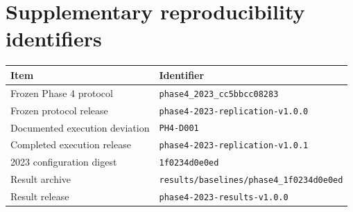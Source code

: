 \documentclass[11pt]{article}
\begin{document}
\section{Supplementary reproducibility identifiers}

\begin{tabularx}{\textwidth}{@{}lY@{}}
  \toprule
  Item & Identifier \\
  \midrule
  Frozen Phase 4 protocol & \texttt{phase4\_2023\_cc5bbcc08283} \\
  Frozen protocol release & \texttt{phase4-2023-replication-v1.0.0} \\
  Documented execution deviation & \texttt{PH4-D001} \\
  Completed execution release & \texttt{phase4-2023-replication-v1.0.1} \\
  2023 configuration digest & \texttt{1f0234d0e0ed} \\
  Result archive & \texttt{results/baselines/phase4\_1f0234d0e0ed} \\
  Result release & \texttt{phase4-2023-results-v1.0.0} \\
  \bottomrule
\end{tabularx}
\end{document}
